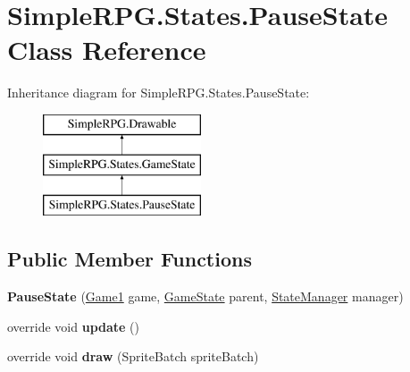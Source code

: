 \hypertarget{class_simple_r_p_g_1_1_states_1_1_pause_state}{\section{Simple\-R\-P\-G.\-States.\-Pause\-State Class Reference}
\label{class_simple_r_p_g_1_1_states_1_1_pause_state}
}
Inheritance diagram for Simple\-R\-P\-G.\-States.\-Pause\-State\-:\begin{figure}[H]
\begin{center}
\leavevmode
\includegraphics[height=3.000000cm]{class_simple_r_p_g_1_1_states_1_1_pause_state}
\end{center}
\end{figure}
\subsection*{Public Member Functions}
\begin{DoxyCompactItemize}
\item 
\hypertarget{class_simple_r_p_g_1_1_states_1_1_pause_state_a70f5183636726b5ec49cfc05636083a6}{{\bfseries Pause\-State} (\hyperlink{class_simple_r_p_g_1_1_game1}{Game1} game, \hyperlink{class_simple_r_p_g_1_1_states_1_1_game_state}{Game\-State} parent, \hyperlink{class_simple_r_p_g_1_1_states_1_1_state_manager}{State\-Manager} manager)}\label{class_simple_r_p_g_1_1_states_1_1_pause_state_a70f5183636726b5ec49cfc05636083a6}

\item 
\hypertarget{class_simple_r_p_g_1_1_states_1_1_pause_state_a3c042a639731a387501b22ec6f5cbd41}{override void {\bfseries update} ()}\label{class_simple_r_p_g_1_1_states_1_1_pause_state_a3c042a639731a387501b22ec6f5cbd41}

\item 
\hypertarget{class_simple_r_p_g_1_1_states_1_1_pause_state_aa364801aece7b7497a0f09fe3fc41085}{override void {\bfseries draw} (Sprite\-Batch sprite\-Batch)}\label{class_simple_r_p_g_1_1_states_1_1_pause_state_aa364801aece7b7497a0f09fe3fc41085}

\end{DoxyCompactItemize}
